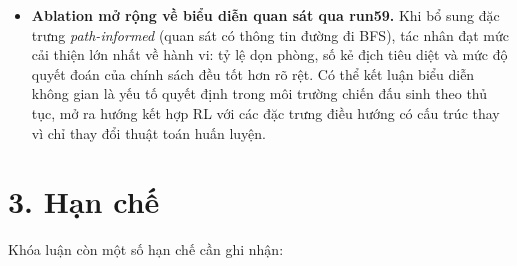 \begin{itemize}
    \item \textbf{Ablation mở rộng về biểu diễn quan sát qua run59.} Khi bổ sung đặc trưng \emph{path-informed} (quan sát có thông tin đường đi BFS), tác nhân đạt mức cải thiện lớn nhất về hành vi: tỷ lệ dọn phòng, số kẻ địch tiêu diệt và mức độ quyết đoán của chính sách đều tốt hơn rõ rệt. Có thể kết luận biểu diễn không gian là yếu tố quyết định trong môi trường chiến đấu sinh theo thủ tục, mở ra hướng kết hợp RL với các đặc trưng điều hướng có cấu trúc thay vì chỉ thay đổi thuật toán huấn luyện.
\end{itemize}

\section*{3. Hạn chế}

Khóa luận còn một số hạn chế cần ghi nhận:

